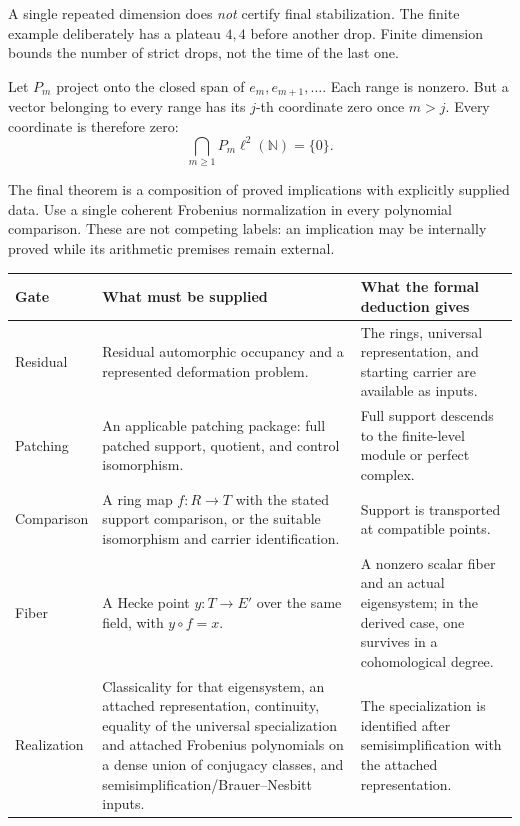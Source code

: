 \begin{insight}
A single repeated dimension does \emph{not} certify final stabilization. The finite example deliberately has a plateau $4,4$ before another drop. Finite dimension bounds the number of strict drops, not the time of the last one.
\end{insight}

Let $P_m$ project onto the closed span of $e_m,e_{m+1},\ldots$. Each range is nonzero. But a vector belonging to every range has its $j$-th coordinate zero once $m>j$. Every coordinate is therefore zero:
\[
\bigcap_{m\ge1}P_m\ell^2(\mathbb N)=\{0\}.
\]


The final theorem is a composition of proved implications with explicitly supplied data. Use a single coherent Frobenius normalization in every polynomial comparison. These are not competing labels: an implication may be internally proved while its arithmetic premises remain external.

{\small
\begin{tabularx}{\linewidth}{@{}p{.13\linewidth}YY@{}}\toprule
\textbf{Gate} & \textbf{What must be supplied} & \textbf{What the formal deduction gives}\\\midrule
Residual & Residual automorphic occupancy and a represented deformation problem. & The rings, universal representation, and starting carrier are available as inputs.\\
Patching & An applicable patching package: full patched support, quotient, and control isomorphism. & Full support descends to the finite-level module or perfect complex.\\
Comparison & A ring map $f:R\to T$ with the stated support comparison, or the suitable isomorphism and carrier identification. & Support is transported at compatible points.\\
Fiber & A Hecke point $y:T\to E'$ over the same field, with $y\circ f=x$. & A nonzero scalar fiber and an actual eigensystem; in the derived case, one survives in a cohomological degree.\\
Realization & Classicality for that eigensystem, an attached representation, continuity, equality of the universal specialization and attached Frobenius polynomials on a dense union of conjugacy classes, and semisimplification/Brauer--Nesbitt inputs. & The specialization is identified after semisimplification with the attached representation.\\\bottomrule
\end{tabularx}}

